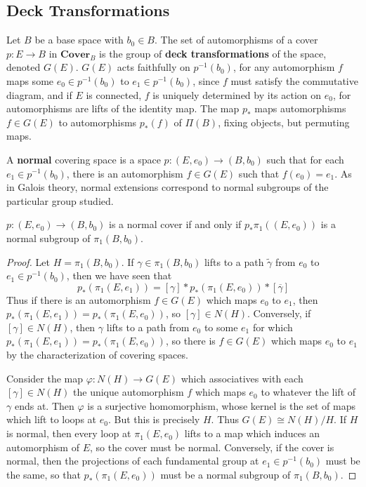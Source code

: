 \subsection{Deck Transformations}

Let $B$ be a base space with $b_0 \in B$. The set of automorphisms of a cover $p: E \to B$ in $\textbf{Cover}_B$ is the group of {\bf deck transformations} of the space, denoted $G(E)$. $G(E)$ acts faithfully on $p^{-1}(b_0)$, for any automorphism $f$ maps some $e_0 \in p^{-1}(b_0)$ to $e_1 \in p^{-1}(b_0)$, since $f$ must satisfy the commutative diagram, and if $E$ is connected, $f$ is uniquely determined by its action on $e_0$, for automorphisms are lifts of the identity map. The map $p_*$ maps automorphisms $f \in G(E)$ to automorphisms $p_*(f)$ of $\Pi(B)$, fixing objects, but permuting maps.

A {\bf normal} covering space is a space $p:(E,e_0) \to (B,b_0)$ such that for each $e_1 \in p^{-1}(b_0)$, there is an automorphism $f \in G(E)$ such that $f(e_0) = e_1$. As in Galois theory, normal extensions correspond to normal subgroups of the particular group studied.

\begin{theorem}
    $p: (E,e_0) \to (B,b_0)$ is a normal cover if and only if $p_*\pi_1((E,e_0))$ is a normal subgroup of $\pi_1(B,b_0)$.
\end{theorem}
\begin{proof}
    Let $H = \pi_1(B,b_0)$. If $\gamma \in \pi_1(B,b_0)$ lifts to a path $\tilde{\gamma}$ from $e_0$ to $e_1 \in p^{-1}(b_0)$, then we have seen that
    \[ p_*(\pi_1(E,e_1)) = [\gamma] * p_*(\pi_1(E,e_0)) * [\overline{\gamma}] \]
    Thus if there is an automorphism $f \in G(E)$ which maps $e_0$ to $e_1$, then $p_*(\pi_1(E,e_1)) = p_*(\pi_1(E,e_0))$, so $[\gamma] \in N(H)$. Conversely, if $[\gamma] \in N(H)$, then $\gamma$ lifts to a path from $e_0$ to some $e_1$ for which $p_*(\pi_1(E,e_1)) = p_*(\pi_1(E,e_0))$, so there is $f \in G(E)$ which maps $e_0$ to $e_1$ by the characterization of covering spaces.

    Consider the map $\varphi: N(H) \to G(E)$ which associatives with each $[\gamma] \in N(H)$ the unique automorphism $f$ which maps $e_0$ to whatever the lift of $\gamma$ ends at. Then $\varphi$ is a surjective homomorphism, whose kernel is the set of maps which lift to loops at $e_0$. But this is precisely $H$. Thus $G(E) \cong N(H)/H$. If $H$ is normal, then every loop at $\pi_1(E,e_0)$ lifts to a map which induces an automorphism of $E$, so the cover must be normal. Conversely, if the cover is normal, then the projections of each fundamental group at $e_1 \in p^{-1}(b_0)$ must be the same, so that $p_*(\pi_1(E,e_0))$ must be a normal subgroup of $\pi_1(B,b_0)$.
\end{proof}

